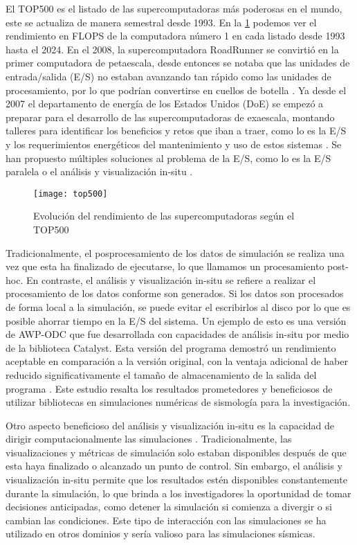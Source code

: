 El TOP500 es el listado de las supercomputadoras más poderosas en el mundo, este se actualiza de manera semestral desde 1993. En la \cref{fig:top500} podemos ver el rendimiento en FLOPS de la computadora número 1 en cada listado desde 1993 hasta el 2024. En el 2008, la supercomputadora RoadRunner se convirtió en la primer computadora de petaescala, desde entonces se notaba que las unidades de entrada/salida (E/S) no estaban avanzando tan rápido como las unidades de procesamiento, por lo que podrían convertirse en cuellos de botella \cite{Narayan2009}. Ya desde el 2007 el departamento de energía de los Estados Unidos (DoE) se empezó a preparar para el desarrollo de las supercomputadoras de exaescala, montando talleres para identificar los beneficios y retos que iban a traer, como lo es la E/S y los requerimientos energéticos del mantenimiento y uso de estos sistemas \cite{Messina2017}. Se han propuesto múltiples soluciones al problema de la E/S, como lo es la E/S paralela \cite{Byna2022} o el análisis y visualización in-situ \cite{akira_kageyama_approach_2014}.

\begin{figure}[ht]
  \texttt{[image: top500]}
  \caption{Evolución del rendimiento de las supercomputadoras según el TOP500\cite{top500}}
  \label{fig:top500}
\end{figure}

Tradicionalmente, el posprocesamiento de los datos de simulación se realiza una vez que esta ha finalizado de ejecutarse, lo que llamamos un procesamiento post-hoc. En contraste, el análisis y visualización in-situ se refiere a realizar el procesamiento de los datos conforme son generados. Si los datos son procesados de forma local a la simulación, se puede evitar el escribirlos al disco por lo que es posible ahorrar tiempo en la E/S del sistema. Un ejemplo de esto es una versión de AWP-ODC que fue desarrollada con capacidades de análisis in-situ por medio de la biblioteca Catalyst. Esta versión del programa demostró un rendimiento aceptable en comparación a la versión original, con la ventaja adicional de haber reducido significativamente el tamaño de almacenamiento de la salida del programa \cite{mu_-situ_2019}. Este estudio resalta los resultados prometedores y beneficiosos de utilizar bibliotecas en simulaciones numéricas de sismología para la investigación.

Otro aspecto beneficioso del análisis y visualización in-situ es la capacidad de dirigir computacionalmente las simulaciones \cite{Grosset2020}. Tradicionalmente, las visualizaciones y métricas de simulación solo estaban disponibles después de que esta haya finalizado o alcanzado un punto de control. Sin embargo, el análisis y visualización in-situ permite que los resultados estén disponibles constantemente durante la simulación, lo que brinda a los investigadores la oportunidad de tomar decisiones anticipadas, como detener la simulación si comienza a divergir o si cambian las condiciones. Este tipo de interacción con las simulaciones se ha utilizado en otros dominios \cite{Yi2014} y sería valioso para las simulaciones sísmicas.

